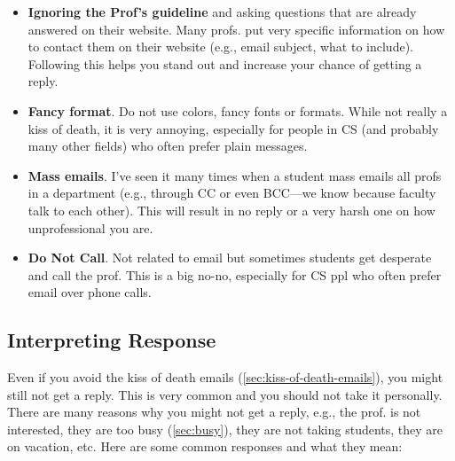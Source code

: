 \documentclass[oneside,11pt,dvipsnames]{book}
\begin{document}
\begin{itemize}
    \item \textbf{Ignoring the Prof's guideline} and asking questions that are already answered on their website.  Many profs. put very specific information on how to contact them on their website (e.g., email subject, what to include).  Following this helps you stand out and increase your chance of getting a reply.
    
    \item \textbf{Fancy format}.  Do not use colors, fancy fonts or formats. While not really a kiss of death, it is very annoying, especially for people in CS (and probably many other fields) who often prefer plain messages.
    
    \item \textbf{Mass emails}. I've seen it many times when a student mass emails all profs in a department (e.g., through CC or even BCC---we know because faculty talk to each other).  This will result in no reply or a very harsh one on how unprofessional you are.
    
    \item \textbf{Do Not Call}. Not related to email but sometimes students get desperate and call the prof.  This is a big no-no, especially for CS ppl who often prefer email over phone calls. 
\end{itemize}

\subsection{Interpreting Response}\label{sec:interpreting-response}
Even if you avoid the kiss of death emails (\autoref{sec:kiss-of-death-emails}), you might still not get a reply.  This is very common and you should not take it personally.  There are many reasons why you might not get a reply, e.g., the prof. is not interested, they are too busy (\autoref{sec:busy}), they are not taking students, they are on vacation, etc.  Here are some common responses and what they mean:
\end{document}
